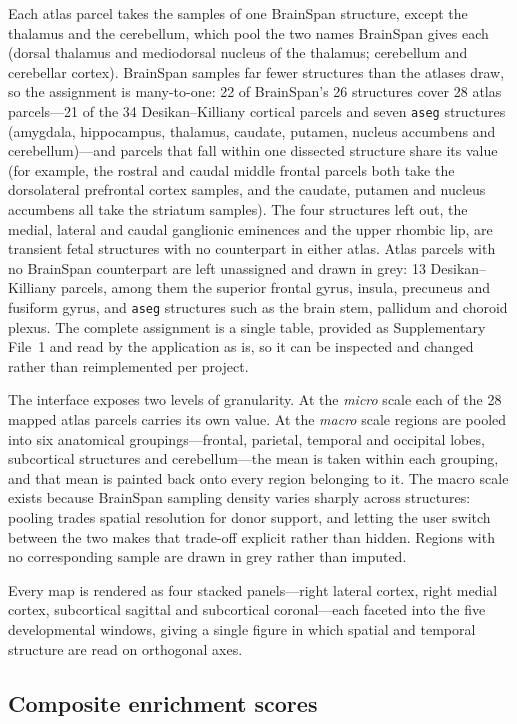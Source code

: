 \documentclass[pdflatex,sn-basic]{sn-jnl}
\begin{document}
Each atlas parcel takes the samples of one BrainSpan structure, except the
thalamus and the cerebellum, which pool the two names BrainSpan gives each
(dorsal thalamus and mediodorsal nucleus of the thalamus; cerebellum and
cerebellar cortex). BrainSpan samples far fewer structures than the atlases
draw, so the assignment is many-to-one: 22 of BrainSpan's 26 structures cover
28 atlas parcels---21 of the 34 Desikan--Killiany cortical parcels and seven
\texttt{aseg} structures (amygdala, hippocampus, thalamus, caudate, putamen,
nucleus accumbens and cerebellum)---and parcels that fall within one dissected
structure share its value (for example, the rostral and caudal middle frontal
parcels both take the dorsolateral prefrontal cortex samples, and the caudate,
putamen and nucleus accumbens all take the striatum samples). The four
structures left out, the medial, lateral and caudal ganglionic eminences and
the upper rhombic lip, are transient fetal structures with no counterpart in
either atlas. Atlas parcels with no BrainSpan counterpart are left unassigned
and drawn in grey: 13 Desikan--Killiany parcels, among them the superior
frontal gyrus, insula, precuneus and fusiform gyrus, and \texttt{aseg}
structures such as the brain stem, pallidum and choroid plexus. The complete assignment is a single
table, provided as Supplementary File~1 and read by the application as is, so
it can be inspected and changed rather than reimplemented per project.

The interface exposes two levels of granularity. At the \emph{micro} scale each
of the 28 mapped atlas parcels carries its own value. At the \emph{macro} scale
regions are pooled into six anatomical groupings---frontal, parietal, temporal
and occipital lobes, subcortical structures and cerebellum---the mean is taken
within each grouping, and that mean is painted back onto every region belonging
to it. The macro scale exists because BrainSpan sampling density varies sharply
across structures: pooling trades spatial resolution for donor support, and
letting the user switch between the two makes that trade-off explicit rather
than hidden. Regions with no corresponding sample are drawn in grey rather than
imputed.

Every map is rendered as four stacked panels---right lateral cortex, right
medial cortex, subcortical sagittal and subcortical coronal---each faceted into
the five developmental windows, giving a single figure in which spatial and
temporal structure are read on orthogonal axes.

\subsection{Composite enrichment scores}\label{sec:ssgsea}
\end{document}
